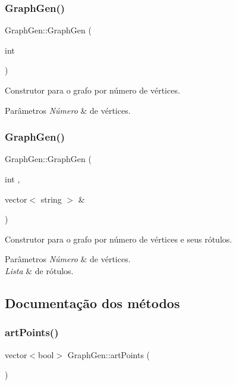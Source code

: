\subsubsection{\texorpdfstring{Graph\+Gen()}{GraphGen()}\hspace{0.1cm}{\footnotesize\ttfamily [1/2]}}
{\footnotesize\ttfamily Graph\+Gen\+::\+Graph\+Gen (\begin{DoxyParamCaption}\item[{int}]{ }\end{DoxyParamCaption})}

Construtor para o grafo por número de vértices. 
\begin{DoxyParams}{Parâmetros}
{\em Número} & de vértices. \\
\hline
\end{DoxyParams}
\mbox{\label{classGraphGen_abdb70c362c414ff5a18ab3796126a1a9}} 
\subsubsection{\texorpdfstring{Graph\+Gen()}{GraphGen()}\hspace{0.1cm}{\footnotesize\ttfamily [2/2]}}
{\footnotesize\ttfamily Graph\+Gen\+::\+Graph\+Gen (\begin{DoxyParamCaption}\item[{int}]{,  }\item[{vector$<$ string $>$ \&}]{ }\end{DoxyParamCaption})}

Construtor para o grafo por número de vértices e seus rótulos. 
\begin{DoxyParams}{Parâmetros}
{\em Número} & de vértices. \\
\hline
{\em Lista} & de rótulos. \\
\hline
\end{DoxyParams}


\subsection{Documentação dos métodos}
\mbox{\label{classGraphGen_abfc9e2946585f5ea7e2948cd724d37e8}} 
\subsubsection{\texorpdfstring{art\+Points()}{artPoints()}}
{\footnotesize\ttfamily vector$<$bool$>$ Graph\+Gen\+::art\+Points (\begin{DoxyParamCaption}{ }\end{DoxyParamCaption})}

